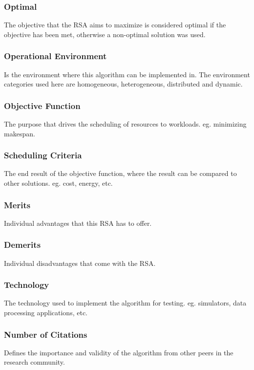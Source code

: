 \documentclass[12pt]{article}
\begin{document}
\subsubsection{Optimal} The objective that the RSA aims to maximize is considered optimal if the objective has been met, otherwise a non-optimal solution was used.

\subsubsection{Operational Environment} Is the environment where this algorithm can be implemented in. The environment categories used here are homogeneous, heterogeneous, distributed and dynamic.

\subsubsection{Objective Function} The purpose that drives the scheduling of resources to workloads. eg. minimizing makespan.

\subsubsection{Scheduling Criteria} The end result of the objective function, where the result can be compared to other solutions. eg. cost, energy, etc.

\subsubsection{Merits} Individual advantages that this RSA has to offer.

\subsubsection{Demerits} Individual disadvantages that come with the RSA.

\subsubsection{Technology} The technology used to implement the algorithm for testing. eg. simulators, data processing applications, etc.

\subsubsection{Number of Citations} Defines the importance and validity of the algorithm from other peers in the research community.
\end{document}
